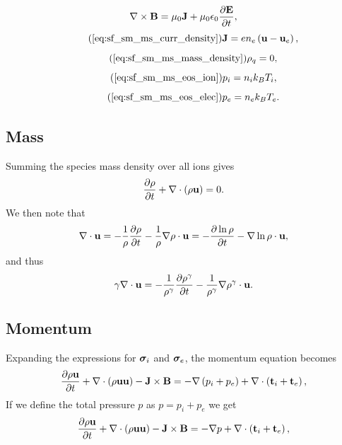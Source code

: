 \documentclass[a4paper,11pt]{report}
\begin{document}
\begin{equation}
    \label{eq:sf_sm_ms_maxwell_2}
    \nabla \times \mathbf{B} = \mu_0 \mathbf{J} + \mu_0 \epsilon_0 \frac{\partial \mathbf{E}}{\partial t},
\end{equation}
\begin{equation}
    \tag{\ref{eq:sf_sm_ms_curr_density}}
    \Jvec = e n_e \left( \uvec - \uvec_e \right),
\end{equation}
\begin{equation}
    \tag{\ref{eq:sf_sm_ms_mass_density}}
    \rho_q = 0,
\end{equation}
\begin{equation}
    \tag{\ref{eq:sf_sm_ms_eos_ion}}
    p_i = n_i k_B T_i,
\end{equation}
\begin{equation}
    \tag{\ref{eq:sf_sm_ms_eos_elec}}
    p_e = n_e k_B T_e.
\end{equation}

\subsection{Mass}

Summing the species mass density over all ions gives
\begin{equation}
    \frac{\partial \rho}{\partial t} + \nabla \cdot \left( \rho \mathbf{u} \right) = 0.
\end{equation}
We then note that
\begin{equation*}
    \nabla \cdot \mathbf{u} = -\frac{1}{\rho} \frac{\partial \rho}{\partial t} - \frac{1}{\rho} \nabla \rho \cdot \mathbf{u} = - \frac{\partial \ln{\rho} }{\partial t} -  \nabla \ln{\rho} \cdot \mathbf{u},
\end{equation*}
and thus
\begin{equation}
    \label{eq:mhd_div_trick}
    \gamma \nabla \cdot \mathbf{u} = -\frac{1}{\rho^\gamma} \frac{\partial \rho^\gamma}{\partial t} - \frac{1}{\rho^\gamma} \nabla \rho^\gamma \cdot \mathbf{u}.
\end{equation}

\subsection{Momentum}

Expanding the expressions for $\bm \sigma_i$ and $\bm \sigma_e$, the momentum equation becomes
\begin{equation*}
    \frac{\partial \rho \mathbf{u}}{\partial t} + \nabla \cdot \left( \rho \mathbf{u} \mathbf{u} \right) - \mathbf{J} \times \mathbf{B} = -\nabla \left(  p_i + p_e \right) + \nabla \cdot \left(  \mathbf{t}_i + \mathbf{t}_e \right),
\end{equation*}
If we define the total pressure $p$ as $p = p_i + p_e$ we get
\begin{equation*}
    \frac{\partial \rho \mathbf{u}}{\partial t} + \nabla \cdot \left( \rho \mathbf{u} \mathbf{u} \right) - \mathbf{J} \times \mathbf{B} = -\nabla p + \nabla \cdot \left(  \mathbf{t}_i + \mathbf{t}_e \right),
\end{equation*}
\end{document}
